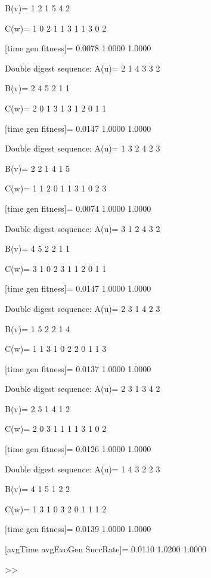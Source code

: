 B(v)=
     1     2     1     5     4     2

C(w)=
     1     0     2     1     1     3     1     1     3     0     2

[time gen fitness]=
    0.0078    1.0000    1.0000

Double digest sequence:
A(u)=
     2     1     4     3     3     2

B(v)=
     2     4     5     2     1     1

C(w)=
     2     0     1     3     1     3     1     2     0     1     1

[time gen fitness]=
    0.0147    1.0000    1.0000

Double digest sequence:
A(u)=
     1     3     2     4     2     3

B(v)=
     2     2     1     4     1     5

C(w)=
     1     1     2     0     1     1     3     1     0     2     3

[time gen fitness]=
    0.0074    1.0000    1.0000

Double digest sequence:
A(u)=
     3     1     2     4     3     2

B(v)=
     4     5     2     2     1     1

C(w)=
     3     1     0     2     3     1     1     2     0     1     1

[time gen fitness]=
    0.0147    1.0000    1.0000

Double digest sequence:
A(u)=
     2     3     1     4     2     3

B(v)=
     1     5     2     2     1     4

C(w)=
     1     1     3     1     0     2     2     0     1     1     3

[time gen fitness]=
    0.0137    1.0000    1.0000

Double digest sequence:
A(u)=
     2     3     1     3     4     2

B(v)=
     2     5     1     4     1     2

C(w)=
     2     0     3     1     1     1     1     3     1     0     2

[time gen fitness]=
    0.0126    1.0000    1.0000

Double digest sequence:
A(u)=
     1     4     3     2     2     3

B(v)=
     4     1     5     1     2     2

C(w)=
     1     3     1     0     3     2     0     1     1     1     2

[time gen fitness]=
    0.0139    1.0000    1.0000

[avgTime  avgEvoGen  SuccRate]=
    0.0110    1.0200    1.0000

>> 